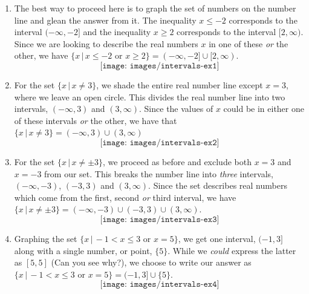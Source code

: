 \begin{solution} 
	
	\begin{enumerate}
		
		\item  The best way to proceed here is to graph the set of numbers on the number line and glean the answer from it.  The inequality $x \leq -2$ corresponds to the interval $(-\infty, -2]$ and the inequality $x \geq 2$ corresponds to the interval $[2, \infty)$.  Since we are looking to describe the real numbers $x$ in one of these \textit{or} the other, we have $\{ x \, | \, x \leq -2 \, \, \text{or} \, \,  x \geq 2 \} = (-\infty, -2] \cup [2, \infty)$.\\
		 $$\texttt{[image: images/intervals-ex1]}$$
		
		
		
		\item For the set $\{ x \, | \, x \neq 3 \}$, we shade the entire real number line except $x=3$, where we leave an open circle.  This divides the real number line into two intervals, $(-\infty, 3)$ and $(3,\infty)$.  Since the values of $x$ could be in either one of these intervals \textit{or} the other, we have that $\{ x \, | \, x \neq 3 \} = (-\infty, 3) \cup (3,\infty)$\\
		$$\texttt{[image: images/intervals-ex2]}$$
		
	
			
		
		\item  For the set $\{ x \, | \, x \neq \pm 3 \}$, we proceed as before and exclude both $x=3$ and $x=-3$ from our set.  This breaks the number line into \textit{three} intervals, $(-\infty, -3)$, $(-3,3)$ and $(3, \infty)$.   Since the set describes real numbers which come from the first, second \textit{or} third interval, we have $\{ x \, | \, x \neq \pm 3 \} = (-\infty, -3) \cup (-3,3) \cup (3, \infty)$.\\
		$$\texttt{[image: images/intervals-ex3]}$$
		
		
	
		
		\item  Graphing the set $\{ x \, | \, -1 < x \leq 3 \,\, \text{or} \,\, x = 5\}$, we get one interval, $(-1,3]$ along with a single number, or point, $\{ 5\}$.  While we \textit{could} express the latter as $[5,5]$ (Can you see why?), we choose to write our answer as $\{ x \, | \, -1 < x \leq 3 \,\, \text{or} \,\, x = 5\} = (-1,3] \cup \{ 5\}$.\\
		$$\texttt{[image: images/intervals-ex4]}$$
		

	\end{enumerate}
	
		
\end{solution}









